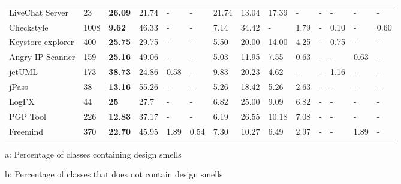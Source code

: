 \documentclass[AMA,Times1COL]{WileyNJDv5} %
\begin{document}
\begin{table}[h]
\begin{tabular*}{\textwidth}{@{\extracolsep\fill}llllllllllllll@{}}
		LiveChat Server & 23 &\textbf{26.09}     & 21.74     & -	 & - & 21.74  & 13.04  & 17.39	& -  & -       & -       & -	       & -      \\
		Checkstyle & 1008  & \textbf{9.62}  & 46.33   & -	 & - & 7.14  & 34.42 & -            & 1.79  & -       & 0.10       & -	       & 0.60 \\
		Keystore explorer & 400 & \textbf{25.75}  & 29.75   & -	 & - & 5.50 & 20.00 & 14.00  & 4.25  & -  & 0.75 & - & -      \\
		Angry IP Scanner & 159 &\textbf{25.16}	& 49.06  & -	 & - & 5.03  & 11.95  & 7.55      & 0.63  & -       & -       & 0.63 & -      \\ 
		jetUML & 173 & \textbf{38.73} & 24.86 & 0.58 & - & 9.83                       & 20.23 & 4.62 & -  & -       & 1.16 & -	       & -      \\
		jPass & 38  &  \textbf{13.16} & 55.26 & - & - & 5.26  & 18.42 & 5.26 & 2.63 & -       & -       & -	       & -      \\
		LogFX & 44  & \textbf{25} & 27.7 & - & - & 6.82 & 25.00 & 9.09 & 6.82 & -       & -       & -	       & -      \\
		PGP Tool & 226  & \textbf{12.83} & 37.17 & - & - & 6.19  & 26.55 & 10.18 & 7.08 & -       & -       & -	       & -      \\
		Freemind & 370  &  \textbf{22.70} & 45.95 & 1.89 & 0.54 & 7.30 & 10.27 & 6.49 & 2.97 & -       & -       & 1.89	       & -      \\
		\bottomrule
	\end{tabular*}
		\begin{tablenotes}%
			\item[a: ] Percentage of classes containing design smells
			\item[b: ] Percentage of classes that does not contain design smells
		\end{tablenotes}
\end{table}
\end{document}
